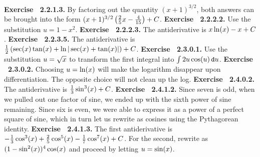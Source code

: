  {\noindent \protect \bf  Exercise ~2.2.1.3.} By factoring out the quantity $(x+1)^{3/2}$, both answers can be brought into the form $(x+1)^{3/2}\left (\protect \frac  {2}{5}x-\protect \frac  {4}{15}\right )+C$. \protect \newline  \protect \newline  
 {\noindent \protect \bf  Exercise ~2.2.2.2.} Use the substitution $u=1-x^2$. \protect \newline  \protect \newline  
 {\noindent \protect \bf  Exercise ~2.2.2.3.} The antiderivative is $x\protect \qopname  \relax o{ln}(x)-x+C$. \protect \newline  \protect \newline  
 {\noindent \protect \bf  Exercise ~2.2.3.5.} The antiderivative is $\protect \frac  {1}{2}\left (\protect \qopname  \relax o{sec}(x)\protect \qopname  \relax o{tan}(x)+\protect \qopname  \relax o{ln}|\protect \qopname  \relax o{sec}(x)+\protect \qopname  \relax o{tan}(x)|\right )+C$. \protect \newline  \protect \newline  
 {\noindent \protect \bf  Exercise ~2.3.0.1.} Use the substitution $u=\protect \sqrt  {x}$ to transform the first integral into $\intop 2u\protect \qopname  \relax o{cos}(u) \mathop {}\protect \tmspace  -\thinmuskip {.1667em}\protect \mathtt  {d}u$. \protect \newline  \protect \newline  
 {\noindent \protect \bf  Exercise ~2.3.0.2.} Choosing $u=\protect \qopname  \relax o{ln}(x)$ will make the logarithm disappear upon differentiation. The opposite choice will not clean up the log. \protect \newline  \protect \newline  
 {\noindent \protect \bf  Exercise ~2.4.0.2.} The antiderivative is $\protect \frac  {1}{3}\protect \qopname  \relax o{sin}^3(x)+C$. \protect \newline  \protect \newline  
 {\noindent \protect \bf  Exercise ~2.4.1.2.} Since seven is odd, when we pulled out one factor of sine, we ended up with the sixth power of sine remaining. Since six is even, we were able to express it as a power of a perfect square of sine, which in turn let us rewrite as cosines using the Pythagorean identity. \protect \newline  \protect \newline  
 {\noindent \protect \bf  Exercise ~2.4.1.3.} The first antiderivative is $-\protect \frac  {1}{3}\protect \qopname  \relax o{cos}^3(x)+\protect \frac  {2}{5}\protect \qopname  \relax o{cos}^5(x)-\protect \frac  {1}{7}\protect \qopname  \relax o{cos}^7(x)+C$. For the second, rewrite as $(1-\protect \qopname  \relax o{sin}^2(x))^4\protect \qopname  \relax o{cos}(x)$ and proceed by letting $u=\protect \qopname  \relax o{sin}(x)$. \protect \newline  \protect \newline  
